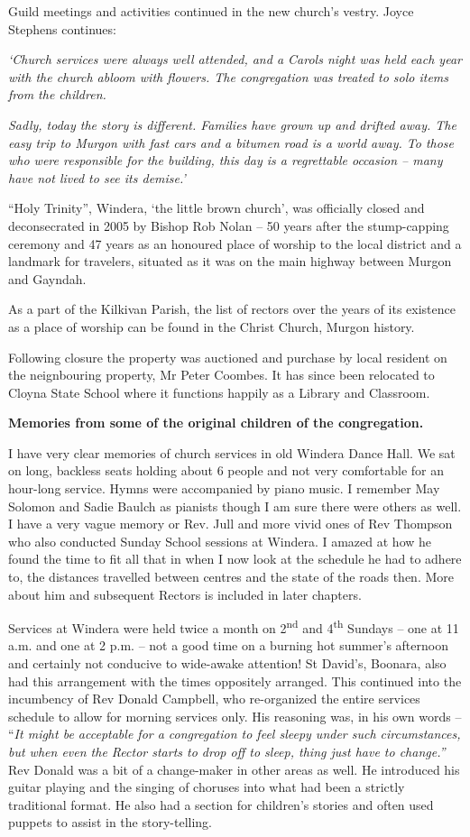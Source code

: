 Guild meetings and activities continued in the new church's vestry. Joyce Stephens continues:

\emph{`Church services were always well attended, and a Carols night was held each year with the church abloom with flowers. The congregation was treated to solo items from the children.}

\emph{Sadly, today the story is different. Families have grown up and drifted away. The easy trip to Murgon with fast cars and a bitumen road is a world away. To those who were responsible for the building, this day is a regrettable occasion -- many have not lived to see its demise.'}

``Holy Trinity'', Windera, `the little brown church', was officially closed and deconsecrated in 2005 by Bishop Rob Nolan -- 50 years after the stump-capping ceremony and 47 years as an honoured place of worship to the local district and a landmark for travelers, situated as it was on the main highway between Murgon and Gayndah.

As a part of the Kilkivan Parish, the list of rectors over the years of its existence as a place of worship can be found in the Christ Church, Murgon history.

Following closure the property was auctioned and purchase by local resident on the neignbouring property, Mr Peter Coombes. It has since been relocated to Cloyna State School where it functions happily as a Library and Classroom.

\textbf{Memories from some of the original children of the congregation.}

I have very clear memories of church services in old Windera Dance Hall. We sat on long, backless seats holding about 6 people and not very comfortable for an hour-long service. Hymns were accompanied by piano music. I remember May Solomon and Sadie Baulch as pianists though I am sure there were others as well. I have a very vague memory or Rev. Jull and more vivid ones of Rev Thompson who also conducted Sunday School sessions at Windera. I amazed at how he found the time to fit all that in when I now look at the schedule he had to adhere to, the distances travelled between centres and the state of the roads then. More about him and subsequent Rectors is included in later chapters.

Services at Windera were held twice a month on 2\textsuperscript{nd} and 4\textsuperscript{th} Sundays -- one at 11 a.m. and one at 2 p.m. -- not a good time on a burning hot summer's afternoon and certainly not conducive to wide-awake attention! St David's, Boonara, also had this arrangement with the times oppositely arranged. This continued into the incumbency of Rev Donald Campbell, who re-organized the entire services schedule to allow for morning services only. His reasoning was, in his own words -- ``\emph{It might be acceptable for a congregation to feel sleepy under such circumstances, but when even the Rector starts to drop off to sleep, thing just have to change.''} Rev Donald was a bit of a change-maker in other areas as well. He introduced his guitar playing and the singing of choruses into what had been a strictly traditional format. He also had a section for children's stories and often used puppets to assist in the story-telling.

